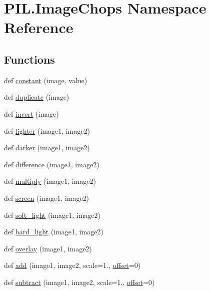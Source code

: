 \hypertarget{namespacePIL_1_1ImageChops}{}\section{P\+I\+L.\+Image\+Chops Namespace Reference}
\label{namespacePIL_1_1ImageChops}
\subsection*{Functions}
\begin{DoxyCompactItemize}
\item 
def \hyperlink{namespacePIL_1_1ImageChops_a0a5d85803c6f9839917b8b75aaf86995}{constant} (image, value)
\item 
def \hyperlink{namespacePIL_1_1ImageChops_ad3963abe16bb89faf0687f813b24cabc}{duplicate} (image)
\item 
def \hyperlink{namespacePIL_1_1ImageChops_a0d9f80a2da4f82856acd12cba51c05ae}{invert} (image)
\item 
def \hyperlink{namespacePIL_1_1ImageChops_a0e6eb49139eb74e7f63daec6838434d6}{lighter} (image1, image2)
\item 
def \hyperlink{namespacePIL_1_1ImageChops_abf079eadb4a8045416910230e4379c01}{darker} (image1, image2)
\item 
def \hyperlink{namespacePIL_1_1ImageChops_a13657e8e933888ae94db7e855cef72a1}{difference} (image1, image2)
\item 
def \hyperlink{namespacePIL_1_1ImageChops_ab78375930238a5b4b79812ddbf604135}{multiply} (image1, image2)
\item 
def \hyperlink{namespacePIL_1_1ImageChops_a9064f4f8184020483ffc7ea98509a4af}{screen} (image1, image2)
\item 
def \hyperlink{namespacePIL_1_1ImageChops_a23c9f4fef663a1548c2380cc91097831}{soft\+\_\+light} (image1, image2)
\item 
def \hyperlink{namespacePIL_1_1ImageChops_a4e4ba02de8192166c79530e57868b914}{hard\+\_\+light} (image1, image2)
\item 
def \hyperlink{namespacePIL_1_1ImageChops_a42606e8a79999207f1f09c7129d78362}{overlay} (image1, image2)
\item 
def \hyperlink{namespacePIL_1_1ImageChops_a839755de44ce63c6a710b7f4831e0067}{add} (image1, image2, scale=1., \hyperlink{namespacePIL_1_1ImageChops_aecb249ce586c43bfc14ac7ca6accad58}{offset}=0)
\item 
def \hyperlink{namespacePIL_1_1ImageChops_afcaf43f590a953e3c9b2569cecdf9dcf}{subtract} (image1, image2, scale=1., \hyperlink{namespacePIL_1_1ImageChops_aecb249ce586c43bfc14ac7ca6accad58}{offset}=0)

\end{DoxyCompactItemize}
